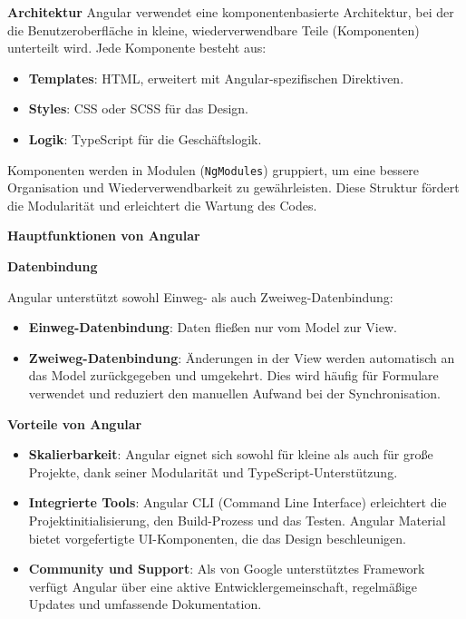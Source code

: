 \textbf{Architektur}
\newline
Angular verwendet eine komponentenbasierte Architektur, bei der die Benutzeroberfläche in kleine, wiederverwendbare Teile (Komponenten) unterteilt wird. Jede Komponente besteht aus:

\begin{itemize}
	\item \textbf{Templates}: HTML, erweitert mit Angular-spezifischen Direktiven.
	\item \textbf{Styles}: CSS oder SCSS für das Design.
	\item \textbf{Logik}: TypeScript für die Geschäftslogik.
\end{itemize}

Komponenten werden in Modulen (\texttt{NgModules}) gruppiert, um eine bessere Organisation und Wiederverwendbarkeit zu gewährleisten. Diese Struktur fördert die Modularität und erleichtert die Wartung des Codes.\textit{\cite{hutagikar2020analysis, shetty2020review, angular}} \newline

\textbf{Hauptfunktionen von Angular}

\textbf{Datenbindung} 

Angular unterstützt sowohl Einweg- als auch Zweiweg-Datenbindung:

\begin{itemize}
	\item \textbf{Einweg-Datenbindung}: Daten fließen nur vom Model zur View.
	\item \textbf{Zweiweg-Datenbindung}: Änderungen in der View werden automatisch an das Model zurückgegeben und umgekehrt. Dies wird häufig für Formulare verwendet und reduziert den manuellen Aufwand bei der Synchronisation.\textit{\cite{hutagikar2020analysis, madurapperuma2022state, angular}}
\end{itemize}

\textbf{Vorteile von Angular}
\begin{itemize}
	\item \textbf{Skalierbarkeit}: Angular eignet sich sowohl für kleine als auch für große Projekte, dank seiner Modularität und TypeScript-Unterstützung.\textit{\cite{madurapperuma2022state, rathinam2022analysis, angular}}
	
	\item \textbf{Integrierte Tools}: Angular CLI (Command Line Interface) erleichtert die Projektinitialisierung, den Build-Prozess und das Testen. Angular Material bietet vorgefertigte UI-Komponenten, die das Design beschleunigen.\textit{\cite{hutagikar2020analysis, angular_blog}}
	
	\item \textbf{Community und Support}: Als von Google unterstütztes Framework verfügt Angular über eine aktive Entwicklergemeinschaft, regelmäßige Updates und umfassende Dokumentation.\textit{\cite{shetty2020review, angular}}
\end{itemize}

